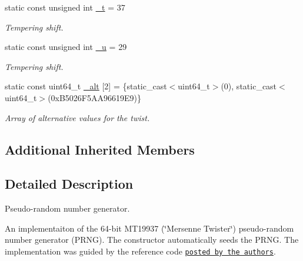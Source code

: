 \begin{DoxyCompactItemize}
\mbox{\label{classsamp_files_1_1_generate_m_t_a1ee601d010446762cfc1ad6c98d6673f}} 
static const unsigned int \hyperlink{classsamp_files_1_1_generate_m_t_a1ee601d010446762cfc1ad6c98d6673f}{\+\_\+t} = 37
\begin{DoxyCompactList}\small\item\em Tempering shift. \end{DoxyCompactList}\item 
\mbox{\label{classsamp_files_1_1_generate_m_t_a115d257a43adaf460b41c8725f016abd}} 
static const unsigned int \hyperlink{classsamp_files_1_1_generate_m_t_a115d257a43adaf460b41c8725f016abd}{\+\_\+u} = 29
\begin{DoxyCompactList}\small\item\em Tempering shift. \end{DoxyCompactList}\item 
\mbox{\label{classsamp_files_1_1_generate_m_t_adf7067ae1e83dd2129650643b5930684}} 
static const uint64\+\_\+t \hyperlink{classsamp_files_1_1_generate_m_t_adf7067ae1e83dd2129650643b5930684}{\+\_\+alt} \mbox{[}2\mbox{]} = \{static\+\_\+cast$<$uint64\+\_\+t$>$(0), static\+\_\+cast$<$uint64\+\_\+t$>$(0x\+B5026\+F5\+A\+A96619\+E9)\}
\begin{DoxyCompactList}\small\item\em Array of alternative values for the twist. \end{DoxyCompactList}\end{DoxyCompactItemize}
\subsection*{Additional Inherited Members}


\subsection{Detailed Description}
Pseudo-\/random number generator. 

An implementaiton of the 64-\/bit M\+T19937 (\char`\"{}\+Mersenne Twister\char`\"{}) \cite{matsumoto98a} pseudo-\/random number generator (P\+R\+NG). The constructor automatically seeds the P\+R\+NG. The implementation was guided by the reference code \href{http://www.math.sci.hiroshima-u.ac.jp/~m-mat/MT/emt64.html}{\tt posted by the authors}. 

